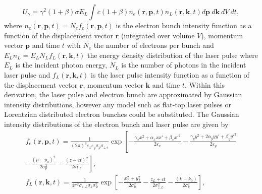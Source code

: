 \documentclass[../main.tex]{subfiles}
\begin{document}
\begin{equation}
U_{\gamma} = \gamma^{2}\left(1+\beta\right)\sigma E_{L}\int c\left(1+\beta\right) n_{e}\left(\mathbf{r},\mathbf{p},t\right)n_{L}\left(\mathbf{r},\mathbf{k},t\right) d\mathbf{p}~d\mathbf{k}~dV~dt,
\label{eq:total_interaction_energy}
\end{equation}
where $n_{e}\left(\mathbf{r},\mathbf{p},t\right) = N_{e}f_{e}\left(\mathbf{r},\mathbf{p},t\right)$ is the  electron bunch intensity function as a function of the displacement vector $\mathbf{r}$ (integrated over volume $V$), momentum vector $\mathbf{p}$ and time $t$ with $N_{e}$ the number of electrons per bunch and $E_{L}n_{L} = E_{L}N_{L}f_{L}\left(\mathbf{r},\mathbf{k},t\right)$ the energy density distribution of the laser pulse where $E_{L}$ is the incident photon energy, $N_{L}$ is the number of photons in the incident laser pulse and $f_{L}\left(\mathbf{r},\mathbf{k},t\right)$ is the laser pulse intensity function as a function of the displacement vector $\mathbf{r}$, momentum vector $\mathbf{k}$ and time $t$. Within this derivation, the laser pulse and electron bunch are approximated by Gaussian intensity distributions, however any model such as flat-top laser pulses or Lorentzian distributed electron bunches could be substituted. The Gaussian intensity distributions of the electron bunch and laser pulse are given by \cite{sun2011theoretical}
\begin{gather}
f_{e}\left(\mathbf{r},\mathbf{p},t\right) = \frac{1}{\left(2\pi\right)^{3}\varepsilon_{x}\varepsilon_{y}\sigma_{p}\sigma_{z,e}}\exp\left[-\frac{\gamma_{x}x^{2}+\alpha_{x}xx'+\beta_{x}x'^{2}}{2\varepsilon_{x}}-\frac{\gamma_{y}y^{2}+2\alpha_{y}yy'+\beta_{y}y'^{2}}{2\varepsilon_{y}}\right.\\\left.-\frac{\left(p-p_{0}\right)^{2}}{2\sigma_{p}^{2}}-\frac{\left(z-ct\right)^{2}}{2\sigma_{z,e}^{2}}\right], \nonumber
\label{eq:electron_gaussian_intensity_distribution} \\
f_{L}\left(\mathbf{r},\mathbf{k},t\right) = \frac{1}{4\pi^{2}\sigma_{z,L}\sigma_{k}\sigma_{w}^{2}}\exp\left[-\frac{x_{L}^{2}+y_{L}^{2}}{2\sigma_{w}^{2}}-\frac{z_{L}+ct}{2\sigma_{z,L}^{2}}-\frac{\left(k-k_{0}\right)}{2\sigma_{k}^{2}}\right],
\label{eq:laser_gaussian_intensity_distribution}
\end{gather}
\end{document}
